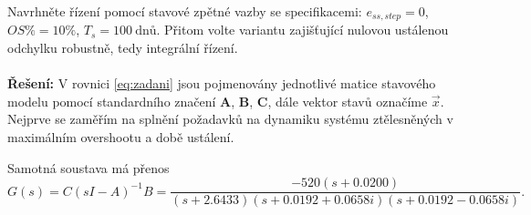 \documentclass[twoside]{article}
\begin{document}
Navrhněte řízení pomocí stavové zpětné vazby se specifikacemi: $e_{ss,step} = 0$, $OS\% = 10\%$, $T_s = 100~\text{dnů}$.
Přitom volte variantu zajišťující nulovou ustálenou odchylku robustně, tedy integrální řízení. \\
\\
\textbf{Řešení:}
V rovnici \eqref{eq:zadani} jsou pojmenovány jednotlivé matice stavového modelu pomocí standardního značení $\mathbf{A}$, $\mathbf{B}$, $\mathbf{C}$,
dále vektor stavů označíme $\vec{x}$. Nejprve se zaměřím na splnění požadavků na dynamiku systému ztělesněných v maximálním overshootu a době ustálení.

Samotná soustava má přenos
\begin{equation}
	G(s) = C (sI - A)^{-1} B =  \frac{-520(s+0.0200)}{(s+2.6433)(s+0.0192+0.0658i)(s+0.0192-0.0658i)}.
\end{equation}
\end{document}
